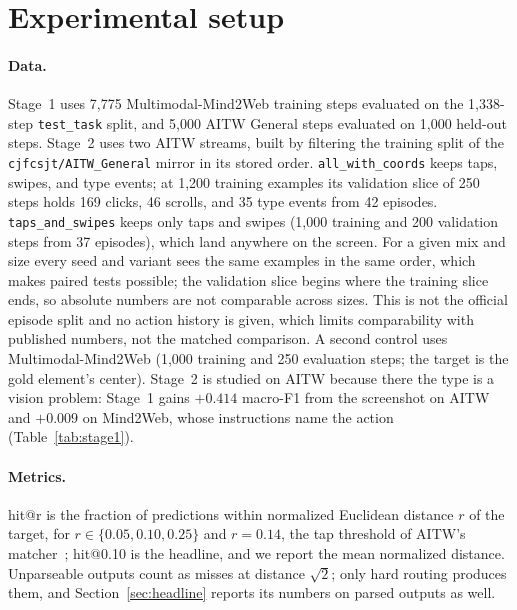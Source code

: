 \documentclass{article}
\makeatletter
\newcommand{\hitat}[1]{hit@#1}
\newcommand{\mix}[1]{\texttt{#1}}
\makeatother
\begin{document}
\section{Experimental setup}
\label{sec:setup}

\paragraph{Data.}
Stage~1 uses 7,775 Multimodal-Mind2Web training steps evaluated on the 1,338-step \texttt{test\_task} split, and 5,000 AITW General steps evaluated on 1,000 held-out steps. Stage~2 uses two AITW streams, built by filtering the training split of the \texttt{cjfcsjt/AITW\_General} mirror in its stored order. \mix{all\_with\_coords} keeps taps, swipes, and type events; at 1,200 training examples its validation slice of 250 steps holds 169 clicks, 46 scrolls, and 35 type events from 42 episodes. \mix{taps\_and\_swipes} keeps only taps and swipes (1,000 training and 200 validation steps from 37 episodes), which land anywhere on the screen. For a given mix and size every seed and variant sees the same examples in the same order, which makes paired tests possible; the validation slice begins where the training slice ends, so absolute numbers are not comparable across sizes. This is not the official episode split and no action history is given, which limits comparability with published numbers, not the matched comparison. A second control uses Multimodal-Mind2Web (1,000 training and 250 evaluation steps; the target is the gold element's center). Stage~2 is studied on AITW because there the type is a vision problem: Stage~1 gains $+0.414$ macro-F1 from the screenshot on AITW and $+0.009$ on Mind2Web, whose instructions name the action (Table~\ref{tab:stage1}).

\paragraph{Metrics.}
\hitat{r} is the fraction of predictions within normalized Euclidean distance $r$ of the target, for $r \in \{0.05, 0.10, 0.25\}$ and $r = 0.14$, the tap threshold of AITW's matcher~\citep{aitw}; \hitat{0.10} is the headline, and we report the mean normalized distance. Unparseable outputs count as misses at distance $\sqrt{2}$; only hard routing produces them, and Section~\ref{sec:headline} reports its numbers on parsed outputs as well.
\end{document}
